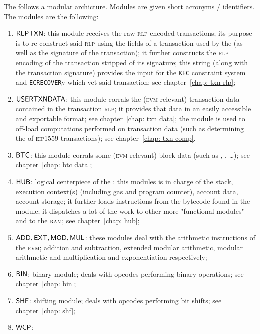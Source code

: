 The \zkEvm{} follows a modular archicture. Modules are given short acronyms / identifiers. The modules are the following:
\begin{enumerate}
	\item $\textsf{RLPTXN}$:
		this module receives the raw \textsc{rlp}-encoded transactions;
		its purpose is to re-construct said \textsc{rlp} using the fields of a transaction used by the \zkEvm{} (as well as the signature of the transaction);
		it further constructs the \textsc{rlp} encoding of the transaction stripped of its signature;
		this string (along with the transaction signature) provides the input for the \texttt{KEC} constraint system and \texttt{ECRECOVER}y which vet said transaction;
		see chapter~\ref{chap: txn rlp};
	\item $\textsf{USERTXNDATA}{}$:
		this module corrals the (\textsc{evm}-relevant) transaction data contained in the transaction \textsc{rlp};
		it provides that data in an easily accessible and exportable format;
		see chapter~\ref{chap: txn data};
		\saNote{} the \btcMod{} module is used to off-load computations performed on transaction data (such as determining the  of \textsc{eip1559} transactions); see chapter~\ref{chap: txn comp}.
	\item $\textsf{BTC}{}$:
		this module corrals some (\textsc{evm}-relevant) block data (such as , , \dots);
		see chapter~\ref{chap: btc data};
	\item $\textsf{HUB}{}$:
		logical centerpiece of the \zkEvm{}: this modules is in charge of the stack, execution context(s) (including gas and program counter), account data, account storage;
		it further loads instructions from the bytecode found in the \romMod{} module;
		it dispatches a lot of the work to other more "functional modules" and to the \textsc{ram};
		see chapter~\ref{chap: hub};
	\item $\textsf{ADD}{}, \textsf{EXT}{}, \textsf{MOD}{}, \textsf{MUL}{}$:
		these modules deal with the arithmetic instructions of the \textsc{evm};
		addition and subtraction, extended modular arithmetic, modular arithmetic and multiplication and exponentiation respectively;
	\item $\textsf{BIN}{}$:
		binary module;
		deals with opcodes performing binary operations;
		see chapter~\ref{chap: bin};
	\item $\textsf{SHF}{}$:
		shifting module;
		deals with opcodes performing bit shifts;
		see chapter~\ref{chap: shf};
	\item $\textsf{WCP}{}$:

\end{enumerate}
